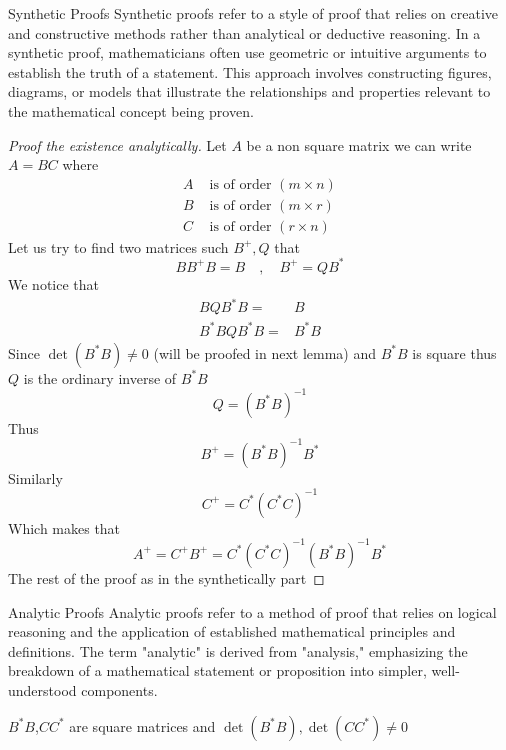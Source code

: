 \begin{enrichment*}{Synthetic Proofs}
    Synthetic proofs refer to a style of proof that relies on creative and constructive methods rather
    than analytical or deductive reasoning. In a synthetic proof, mathematicians often use geometric or intuitive
    arguments to establish the truth of a statement. This approach involves constructing figures, diagrams, or models that illustrate the relationships and properties relevant to the mathematical concept being proven.
\end{enrichment*}
\begin{proof}[\textcolor{theme}{Proof the existence analytically}]
    Let $A$ be a non square matrix we can write $A = BC$ where
    \begin{align*}
        A & \text{ is of order } (m\times n)
        \\
        B & \text{ is of order } (m\times r)
        \\
        C & \text{ is of order } (r\times n)
    \end{align*}
    Let us try to find two matrices such $B^{+} , Q$ that
    \[
        BB^{+} B = B \quad,\quad B^{+} = QB^*
    \]
    We notice that
    \begin{align*}
        BQB^{*}B =      & B
        \\
        B^{*}BQB^{*}B = & B^{*}B
    \end{align*}
    Since $\det(B^{*}B) \neq 0$ (will be proofed in next lemma) and $B^{*}B$ is square thus $Q$ is the ordinary inverse of $B^{*}B$
    \[
        Q = {(B^{*}B)}^{-1}
    \]
    Thus
    \[
        B^{+} = {(B^{*}B)}^{-1}B^*
    \]
    Similarly
    \[
        C^{+} = C^*{(C^{*}C)}^{-1}
    \]
    Which makes that
    \[
        A^{+}  = C^{+}B^{+}= C^*{(C^{*}C)}^{-1}{(B^{*}B)}^{-1}B^*
    \]
    The rest of the proof as in the synthetically part
\end{proof}
\begin{enrichment*}{Analytic Proofs}
    Analytic proofs refer to a method of proof that relies on logical reasoning and the application of established mathematical principles and definitions. The term "analytic" is derived from "analysis," emphasizing the breakdown of a mathematical statement or proposition into simpler, well-understood components.
\end{enrichment*}
\newpage
\begin{lemma}
    $B^{*}B$,$CC^{*}$ are square matrices and $\det(B^{*}B) ,\det(CC^{*}) \neq 0 $
\end{lemma}
